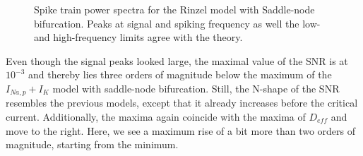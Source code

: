 \documentclass[12pt,a4paper]{article}
\begin{document}
\begin{figure}[H]
	\label{rinzelspec}
	\hspace*{-0.5cm}
	\caption{Spike train power spectra for the Rinzel model with Saddle-node bifurcation. Peaks at signal and spiking frequency as well the low- and high-frequency limits agree with the theory.}
\end{figure}
Even though the signal peaks looked large, the maximal value of the SNR is at $10^{-3}$ and thereby lies three orders of magnitude below the maximum of the $I_{Na,p}+I_K$ model with saddle-node bifurcation. Still, the N-shape of the SNR resembles the previous models, except that it already increases before the critical current. Additionally, the maxima again coincide with the maxima of $D_{eff}$ and move to the right. Here, we see a maximum rise of a bit more than two orders of magnitude, starting from the minimum.
\end{document}
